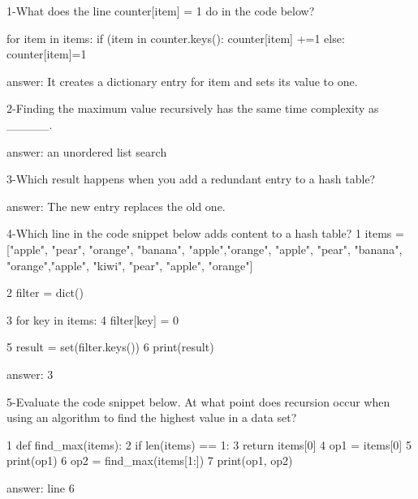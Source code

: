 1-What does the line counter[item] = 1 do in the code below?

for item in items:
  if (item in counter.keys():
  counter[item] +=1
  else:
  counter[item]=1
 
answer: It creates a dictionary entry for item and sets its value to one.

2-Finding the maximum value recursively has the same time complexity as _____.


answer: an unordered list search

3-Which result happens when you add a redundant entry to a hash table?


answer: The new entry replaces the old one.

4-Which line in the code snippet below adds content to a hash table?
1 items = ["apple", "pear", "orange", "banana", "apple","orange", "apple", "pear", "banana", "orange","apple", "kiwi", "pear", "apple", "orange"]

2 filter = dict()

3 for key in items:
4       filter[key] = 0

5 result = set(filter.keys())
6       print(result)


answer: 3

5-Evaluate the code snippet below.
At what point does recursion occur when using an algorithm to find the highest value in a data set? 

1 def find_max(items):
2     if len(items) == 1:
3         return items[0]
4 op1 = items[0]
5 print(op1)
6 op2 = find_max(items[1:])
7 print(op1, op2)


answer: line 6
